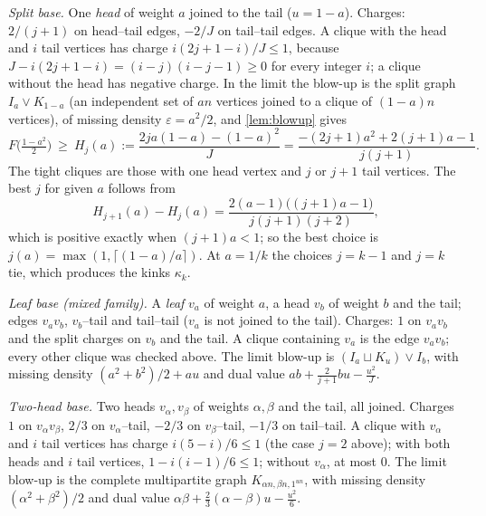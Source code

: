 \documentclass[10pt]{article}
\theoremstyle{definition}
\theoremstyle{remark}
\numberwithin{equation}{section}
\newcommand{\eps}{\varepsilon}
\begin{document}
\emph{Split base.} One \emph{head} of weight $a$ joined to the tail ($u=1-a$). Charges: $2/(j+1)$ on head--tail edges, $-2/J$ on tail--tail edges. A clique with the head and $i$ tail vertices has charge $i(2j+1-i)/J\le1$, because $J-i(2j+1-i)=(i-j)(i-j-1)\ge0$ for every integer $i$; a clique without the head has negative charge. In the limit the blow-up is the split graph $I_a\vee K_{1-a}$ (an independent set of $an$ vertices joined to a clique of $(1-a)n$ vertices), of missing density $\eps=a^2/2$, and \cref{lem:blowup} gives
\begin{equation}\label{eq:splitlower}
 F\bigl(\tfrac{1-a^2}2\bigr)\ \ge\ H_j(a):=\frac{2ja(1-a)-(1-a)^2}{J}=\frac{-(2j+1)a^2+2(j+1)a-1}{j(j+1)}.
\end{equation}
The tight cliques are those with one head vertex and $j$ or $j+1$ tail vertices. The best $j$ for given $a$ follows from
\[
 H_{j+1}(a)-H_j(a)=\frac{2(a-1)\bigl((j+1)a-1\bigr)}{j(j+1)(j+2)},
\]
which is positive exactly when $(j+1)a<1$; so the best choice is $j(a)=\max(1,\lceil(1-a)/a\rceil)$. At $a=1/k$ the choices $j=k-1$ and $j=k$ tie, which produces the kinks $\kappa_k$.

\emph{Leaf base (mixed family).} A \emph{leaf} $v_a$ of weight $a$, a head $v_b$ of weight $b$ and the tail; edges $v_av_b$, $v_b$--tail and tail--tail ($v_a$ is not joined to the tail). Charges: $1$ on $v_av_b$ and the split charges on $v_b$ and the tail. A clique containing $v_a$ is the edge $v_av_b$; every other clique was checked above. The limit blow-up is $(I_a\sqcup K_u)\vee I_b$, with missing density $(a^2+b^2)/2+au$ and dual value $ab+\frac{2}{j+1}bu-\frac{u^2}{J}$.

\emph{Two-head base.} Two heads $v_\alpha,v_\beta$ of weights $\alpha,\beta$ and the tail, all joined. Charges $1$ on $v_\alpha v_\beta$, $2/3$ on $v_\alpha$--tail, $-2/3$ on $v_\beta$--tail, $-1/3$ on tail--tail. A clique with $v_\alpha$ and $i$ tail vertices has charge $i(5-i)/6\le1$ (the case $j=2$ above); with both heads and $i$ tail vertices, $1-i(i-1)/6\le1$; without $v_\alpha$, at most $0$. The limit blow-up is the complete multipartite graph $K_{\alpha n,\beta n,1^{un}}$, with missing density $(\alpha^2+\beta^2)/2$ and dual value $\alpha\beta+\frac23(\alpha-\beta)u-\frac{u^2}6$.
\end{document}
